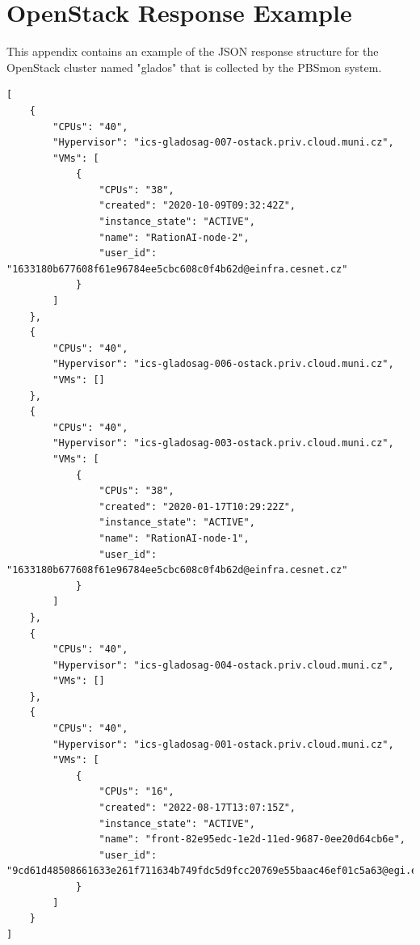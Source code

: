 \documentclass[
  digital,     %
  oneside,     %
  nosansbold,  %
  nocolorbold, %
  lof,         %
  lot,         %
]{fithesis4}
\begin{document}
\appendix
\chapter{OpenStack Response Example}
\label{app:openstack-response-example}

This appendix contains an example of the JSON response structure for the OpenStack cluster named "glados" that is collected by the PBSmon system.

\begin{lstlisting}[caption={Example response for OpenStack cluster "glados"},
  label={lst:openstack-glados-response}]
[
    {
        "CPUs": "40",
        "Hypervisor": "ics-gladosag-007-ostack.priv.cloud.muni.cz",
        "VMs": [
            {
                "CPUs": "38",
                "created": "2020-10-09T09:32:42Z",
                "instance_state": "ACTIVE",
                "name": "RationAI-node-2",
                "user_id": "1633180b677608f61e96784ee5cbc608c0f4b62d@einfra.cesnet.cz"
            }
        ]
    },
    {
        "CPUs": "40",
        "Hypervisor": "ics-gladosag-006-ostack.priv.cloud.muni.cz",
        "VMs": []
    },
    {
        "CPUs": "40",
        "Hypervisor": "ics-gladosag-003-ostack.priv.cloud.muni.cz",
        "VMs": [
            {
                "CPUs": "38",
                "created": "2020-01-17T10:29:22Z",
                "instance_state": "ACTIVE",
                "name": "RationAI-node-1",
                "user_id": "1633180b677608f61e96784ee5cbc608c0f4b62d@einfra.cesnet.cz"
            }
        ]
    },
    {
        "CPUs": "40",
        "Hypervisor": "ics-gladosag-004-ostack.priv.cloud.muni.cz",
        "VMs": []
    },
    {
        "CPUs": "40",
        "Hypervisor": "ics-gladosag-001-ostack.priv.cloud.muni.cz",
        "VMs": [
            {
                "CPUs": "16",
                "created": "2022-08-17T13:07:15Z",
                "instance_state": "ACTIVE",
                "name": "front-82e95edc-1e2d-11ed-9687-0ee20d64cb6e",
                "user_id": "9cd61d48508661633e261f711634b749fdc5d9fcc20769e55baac46ef01c5a63@egi.eu"
            }
        ]
    }
]
\end{lstlisting}
\end{document}
